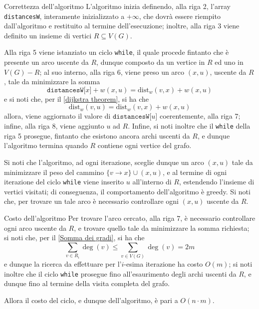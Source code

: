 \documentclass[a4paper, 12pt]{report}
\begin{document}
    \begin{framedobs}{Correttezza dell'algoritmo}
        L'algoritmo inizia definendo, alla riga 2, l'array \texttt{distancesW}, interamente inizializzato a $+ \infty$, che dovrà essere riempito dall'algoritmo e restituito al termine dell'esecuzione; inoltre, alla riga 3 viene definito un insieme di vertici $R \subseteq V(G)$.

        Alla riga 5 viene istanziato un ciclo \texttt{while}, il quale procede fintanto che è presente un arco uscente da $R$, dunque composto da un vertice in $R$ ed uno in $V(G) - R$; al suo interno, alla riga 6, viene preso un arco $(x, u)$, uscente da $R$, tale da minimizzare la somma $$\texttt{distancesW[}x\texttt{]} + w(x, u) = \mathrm{dist}_w(v, x) + w(x, u)$$ e si noti che, per il \cref{dijkstra theorem}, si ha che $$\mathrm{dist}_w(v, u) = \mathrm{dist}_w(v, x) + w(x, u)$$ allora, viene aggiornato il valore di $\texttt{distancesW[}u\texttt{]}$ coerentemente, alla riga 7; infine, alla riga 8, viene aggiunto $u$ ad $R$. Infine, si noti inoltre che il \texttt{while} della riga 5 prosegue, fintanto che esistono ancora archi uscenti da $R$, e dunque l'algoritmo termina quando $R$ contiene ogni vertice del grafo.

        Si noti che l'algoritmo, ad ogni iterazione, sceglie dunque un arco $(x, u)$ tale da minimizzare il peso del cammino $\{v \rightarrow x\} \cup (x, u)$, e al termine di ogni iterazione del ciclo \texttt{while} viene inserito $u$ all'interno di $R$, estendendo l'insieme di vertici visitati; di conseguenza, il comportamento dell'algoritmo è greedy. Si noti che, per trovare un tale arco è necessario controllare ogni $(x, u)$ uscente da $R$.
    \end{framedobs}

    \begin{framedobs}{Costo dell'algoritmo}
        Per trovare l'arco cercato, alla riga 7, è necessario controllare ogni arco uscente da $R$, e trovare quello tale da minimizzare la somma richiesta; si noti che, per il \cref{Somma dei gradi}, si ha che $$\displaystyle \sum_{v \in R_i}{\deg(v)} \le \sum_{v \in V(G)}{\deg(v)} = 2m$$ e dunque la ricerca da effettuare per l'$i$-esima iterazione ha costo $O(m)$; si noti inoltre che il ciclo \texttt{while} prosegue fino all'esaurimento degli archi uscenti da $R$, e dunque fino al termine della visita completa del grafo.

        Allora il costo del ciclo, e dunque dell'algoritmo, è pari a $O(n \cdot m)$.
    \end{framedobs}
\end{document}
